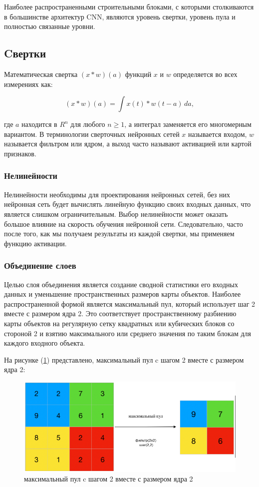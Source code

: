 Наиболее распространенными строительными блоками, с которыми столкиваются в большинстве архитектур CNN, являются уровень свертки, уровень пула и полностью связанные уровни.

\subsection*{Cвертки}

Математическая свертка \((x * w)(a)\) функций \(x\) и \(w\) определяется во всех измерениях как:

\begin{equation}
    (x * w)(a) = \int x(t) * w (t - a) \, da
, \end{equation}

где \(a\) находится в \(R^{n}\) для любого \(n \ge 1\), а интеграл заменяется его многомерным вариантом. В терминологии сверточных нейронных сетей \(x\) называется входом, \(w\) называется фильтром или ядром, а выход часто называют активацией или картой признаков.

\subsubsection*{Нелинейности}

Нелинейности необходимы для проектирования нейронных сетей, без них нейронная сеть будет вычислять линейную функцию своих входных данных, что является слишком ограничительным. Выбор нелинейности может оказать большое влияние на скорость обучения нейронной сети. Следовательно, часто после того, как мы получаем результаты из каждой свертки, мы применяем функцию активации.

\subsubsection*{Объединение слоев}

Целью слоя объединения является создание сводной статистики его входных данных и уменьшение пространственных размеров карты объектов. Наиболее распространенной формой является максимальный пул, который использует шаг 2 вместе с размером ядра 2. Это соответствует пространственному разбиению карты объектов на регулярную сетку квадратных или кубических блоков со стороной 2 и взятию максимального или среднего значения по таким блокам для каждого входного объекта.

На рисунке (\ref{fig:max-pool}) представлено, максимальный пул c шагом 2 вместе с размером ядра 2: 
\begin{figure}[H]
	\centering
	\includegraphics[width=0.5\linewidth]{assets/max-pooling.png}
	\caption{максимальный пул c шагом 2 вместе с размером ядра 2}
	\label{fig:max-pool}
\end{figure}

